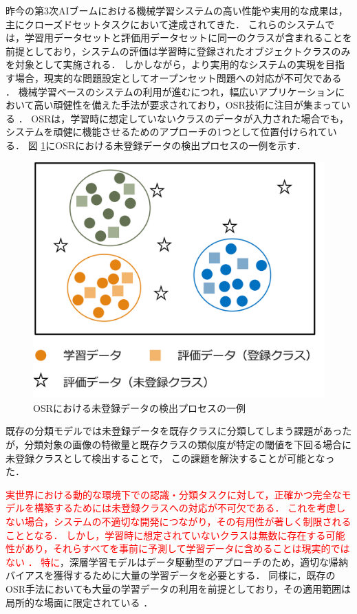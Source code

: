 \documentclass[a4paper,11pt,nomag]{jsreport}
\begin{document}
昨今の第3次AIブームにおける機械学習システムの高い性能や実用的な成果は，主にクローズドセットタスクにおいて達成されてきた．
これらのシステムでは，学習用データセットと評価用データセットに同一のクラスが含まれることを前提としており，システムの評価は学習時に登録されたオブジェクトクラスのみを対象として実施される．
しかしながら，より実用的なシステムの実現を目指す場合，現実的な問題設定としてオープンセット問題への対応が不可欠である \cite{geng2021survey}．
機械学習ベースのシステムの利用が進むにつれ，幅広いアプリケーションにおいて高い頑健性を備えた手法が要求されており，OSR技術に注目が集まっている \cite{sun2023survey}．
OSRは，学習時に想定していないクラスのデータが入力された場合でも，システムを頑健に機能させるためのアプローチの1つとして位置付けられている．
図 \ref{fig:osr}にOSRにおける未登録データの検出プロセスの一例を示す．
% 
\begin{figure}[tbp]
  \centering
  \includegraphics[width=0.6\linewidth, keepaspectratio]{image/osr.png}
  \caption{OSRにおける未登録データの検出プロセスの一例}
  \label{fig:osr}
\end{figure}
% 
既存の分類モデルでは未登録データを既存クラスに分類してしまう課題があったが，分類対象の画像の特徴量と既存クラスの類似度が特定の閾値を下回る場合に未登録クラスとして検出することで，
この課題を解決することが可能となった．

\textcolor{red}{実世界における動的な環境下での認識・分類タスクに対して，正確かつ完全なモデルを構築するためには未登録クラスへの対応が不可欠である．
これを考慮しない場合，システムの不適切な開発につながり，その有用性が著しく制限されることとなる．
しかし，学習時に想定されていないクラスは無数に存在する可能性があり，それらすべてを事前に予測して学習データに含めることは現実的ではない \cite{mahdavi2021survey}．}
\textcolor{red}{特に}，深層学習モデルはデータ駆動型のアプローチのため，適切な帰納バイアスを獲得するために大量の学習データを必要とする．
同様に，既存のOSR手法においても大量の学習データの利用を前提としており，その適用範囲は局所的な場面に限定されている \cite{wang2023}．
\end{document}
